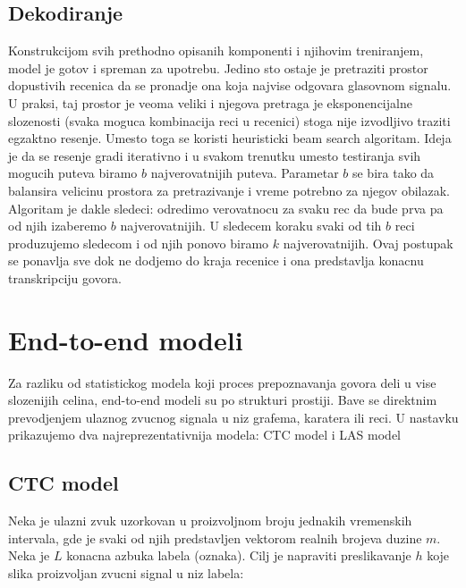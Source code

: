 \documentclass[a4paper]{article}
\begin{document}
\subsection{Dekodiranje}
Konstrukcijom svih prethodno opisanih komponenti i njihovim treniranjem, model je gotov i spreman za upotrebu.
Jedino sto ostaje je pretraziti prostor dopustivih recenica da se pronadje ona koja najvise odgovara glasovnom signalu.
U praksi, taj prostor je veoma veliki i njegova pretraga je eksponencijalne slozenosti (svaka moguca kombinacija reci u recenici) stoga nije izvodljivo traziti egzaktno resenje.
Umesto toga se koristi heuristicki beam search algoritam. Ideja je da se resenje gradi iterativno i u svakom trenutku umesto testiranja svih mogucih puteva biramo $b$ najverovatnijih puteva.
Parametar $b$ se bira tako da balansira velicinu prostora za pretrazivanje i vreme potrebno za njegov obilazak.
Algoritam je dakle sledeci: odredimo verovatnocu za svaku rec da bude prva pa od njih izaberemo $b$ najverovatnijih. U sledecem koraku svaki od tih $b$ reci produzujemo sledecom i od njih ponovo biramo $k$ najverovatnijih.
Ovaj postupak se ponavlja sve dok ne dodjemo do kraja recenice i ona predstavlja konacnu transkripciju govora.

\section{End-to-end modeli}
\label{sec:e2e}



Za razliku od statistickog modela koji proces prepoznavanja govora deli u vise slozenijih celina, end-to-end modeli su po strukturi prostiji. Bave se direktnim prevodjenjem ulaznog zvucnog signala u niz grafema, karatera ili reci.  U nastavku prikazujemo dva najreprezentativnija modela: CTC model \cite{graves2006ctc} i LAS model \cite{chan2015las} \cite{chorowski2015attentionbased}

\subsection{CTC model}
\label{sec:ctc}

Neka je ulazni zvuk uzorkovan u proizvoljnom broju jednakih vremenskih intervala,  gde je svaki od njih predstavljen vektorom realnih brojeva duzine $m$.  Neka je $L$ konacna azbuka labela (oznaka).  Cilj je napraviti preslikavanje $h$ koje slika proizvoljan zvucni signal u niz labela:
\end{document}
